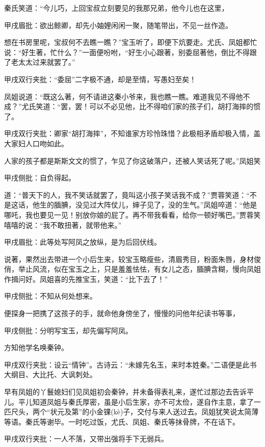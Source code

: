 \begin{parag}


    秦氏笑道：“今儿巧，上回宝叔立刻要见的我那兄弟，他今儿也在这里，\begin{note}甲戌眉批：欲出鲸卿，却先小妯娌闲闲一聚，随笔带出，不见一丝作造。\end{note}想在书房里呢，宝叔何不去瞧一瞧？”宝玉听了，即便下炕要走。尤氏、凤姐都忙说：“好生著，忙什么？”一面便吩咐，“好生小心跟著，别委屈著他，倒比不得跟了老太太过来就罢了。”\begin{note}甲戌双行夹批：“委屈”二字极不通，却是至情，写愚妇至矣！\end{note}凤姐说道：“既这么著，何不请进这秦小爷来，我也瞧一瞧。难道我见不得他不成？”尤氏笑道：“罢，罢！可以不必见他，比不得咱们家的孩子们，胡打海摔的惯了。\begin{note}甲戌双行夹批：卿家“胡打海摔”，不知谁家方珍怜珠惜？此极相矛盾却极入情，盖大家妇人口吻如此。\end{note}人家的孩子都是斯斯文文的惯了，乍见了你这破落户，还被人笑话死了呢。”凤姐笑\begin{note}甲戌侧批：自负得起。\end{note}道：“普天下的人，我不笑话就罢了，竟叫这小孩子笑话我不成？”贾蓉笑道：“不是这话，他生的腼腆，没见过大阵仗儿，婶子见了，没的生气。”凤姐啐道：“他是哪吒，我也要见一见！别放你娘的屁了。再不带我看看，给你一顿好嘴巴。”贾蓉笑嘻嘻的说：“我不敢扭著，就带他来。”\begin{note}甲戌眉批：此等处写阿凤之放纵，是为后回伏线。\end{note}
\end{parag}


\begin{parag}


    说著，果然出去带进一个小后生来，较宝玉略瘦些，清眉秀目，粉面朱唇，身材俊俏，举止风流，似在宝玉之上，只是羞羞怯怯，有女儿之态，腼腆含糊，慢向凤姐作揖问好。凤姐喜的先推宝玉，笑道：“比下去了！”\begin{note}甲戌侧批：不知从何处想来。\end{note}便探身一把携了这孩子的手，就命他身傍坐了，慢慢的问他年纪读书等事，\begin{note}甲戌侧批：分明写宝玉，却先偏写阿凤。\end{note}方知他学名唤秦钟。\begin{note}甲戌双行夹批：设云“情钟”。古诗云：“未嫁先名玉，来时本姓秦。”二语便是此书大纲目、大比托、大讽刺处。\end{note}早有凤姐的丫鬟媳妇们见凤姐初会秦钟，并未备得表礼来，遂忙过那边去告诉平儿。平儿知道凤姐与秦氏厚密，虽是小后生家，亦不可太俭，遂自作主意，拿了一匹尺头，两个“状元及第”的小金锞(kè)子，交付与来人送过去。凤姐犹笑说太简薄等语。秦氏等谢毕。一时吃过饭，尤氏、凤姐、秦氏等抹骨牌，不在话下。\begin{note}甲戌双行夹批：一人不落，又带出强将手下无弱兵。\end{note}
\end{parag}


